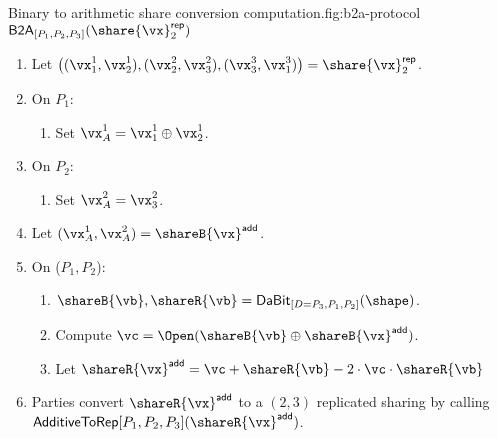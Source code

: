 \begin{Boxfig}{Binary to arithmetic share conversion computation.}{fig:b2a-protocol}
  {$\mathsf{B2A}_{[P_1, P_2, P_3]}(\share{\vx}_2^\mathsf{rep})$}
  \begin{enumerate}
  \item Let $\left( (\vx_1^1, \vx_2^1), (\vx_2^2, \vx_3^2), (\vx_3^3, \vx_1^3) \right) = \share{\vx}_2^\mathsf{rep}$.
  \item On $P_1$:
  \begin{enumerate}
  \item Set $\vx_A^1 = \vx_1^1 \oplus \vx_2^1$.
  \end{enumerate}
  \item On $P_2$:
  \begin{enumerate}
      \item Set $\vx_A^2 = \vx_3^2$.
  \end{enumerate}
  \item Let $(\vx_A^1, \vx_A^2) = \shareB{\vx}^\mathsf{add}$.
  \item On ($P_1, P_2$):
  \begin{enumerate}
      \item $\shareB{\vb}, \shareR{\vb} = \textsf{DaBit}_{[D=P_3, P_1, P_2]}(\shape)$.
      \item Compute $\vc = \Open( \shareB{\vb} \oplus \shareB{\vx}^{\mathsf{add}})$.
      \item Let $\shareR{\vx}^\mathsf{add} = \vc + \shareR{\vb} - 2 \cdot \vc \cdot \shareR{\vb}$
  \end{enumerate}
  \item Parties convert $\shareR{\vx}^\mathsf{add}$ to a $(2,3)$ replicated sharing by calling
  $\textsf{AdditiveToRep}[P_1,P_2,P_3](\shareR{\vx}^\mathsf{add})$.
\end{enumerate}

\end{Boxfig}

